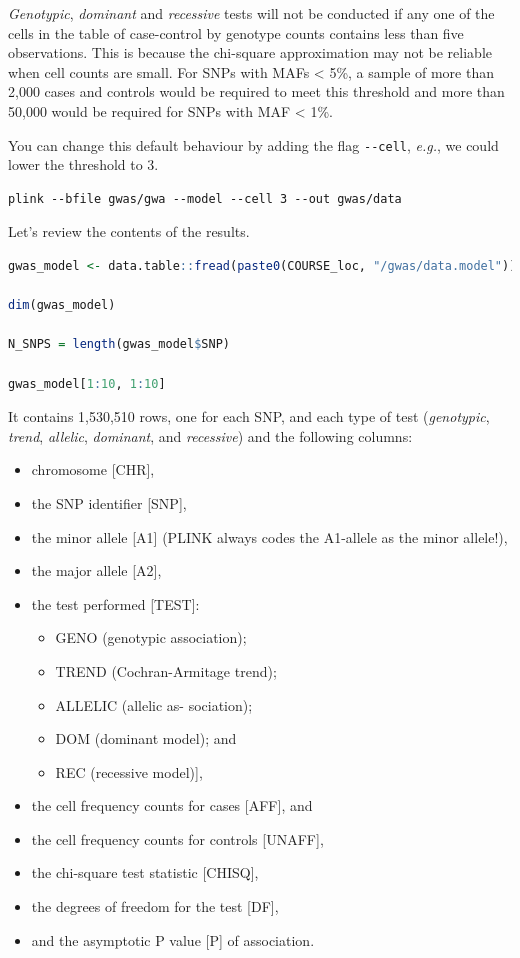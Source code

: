 \documentclass[
]{book}
\newcommand{\passthrough}[1]{#1}
\providecommand{\tightlist}{%
  \setlength{\itemsep}{0pt}\setlength{\parskip}{0pt}}
\begin{document}
\emph{Genotypic}, \emph{dominant} and \emph{recessive} tests will not be conducted if any one of the cells in the table of case-control by genotype counts contains less than five observations. This is because the chi-square approximation may not be reliable when cell counts are small. For SNPs with MAFs \textless{} 5\%, a sample of more than 2,000 cases and controls would be required to meet this threshold and more than 50,000 would be required for SNPs with MAF \textless{} 1\%.

You can change this default behaviour by adding the flag \passthrough{\lstinline!--cell!}, \emph{e.g.}, we could lower the threshold to 3.

\begin{lstlisting}
plink --bfile gwas/gwa --model --cell 3 --out gwas/data
\end{lstlisting}

Let's review the contents of the results.

\begin{lstlisting}[language=R]
gwas_model <- data.table::fread(paste0(COURSE_loc, "/gwas/data.model"))

dim(gwas_model)

N_SNPS = length(gwas_model$SNP)

gwas_model[1:10, 1:10]
\end{lstlisting}

It contains 1,530,510 rows, one for each SNP, and each type of test (\emph{genotypic}, \emph{trend}, \emph{allelic}, \emph{dominant}, and \emph{recessive}) and the following columns:

\begin{itemize}
\tightlist
\item
  chromosome {[}CHR{]},
\item
  the SNP identifier {[}SNP{]},
\item
  the minor allele {[}A1{]} (PLINK always codes the A1-allele as the minor allele!),
\item
  the major allele {[}A2{]},
\item
  the test performed {[}TEST{]}:

  \begin{itemize}
  \tightlist
  \item
    GENO (genotypic association);
  \item
    TREND (Cochran-Armitage trend);
  \item
    ALLELIC (allelic as- sociation);
  \item
    DOM (dominant model); and
  \item
    REC (recessive model){]},
  \end{itemize}
\item
  the cell frequency counts for cases {[}AFF{]}, and
\item
  the cell frequency counts for controls {[}UNAFF{]},
\item
  the chi-square test statistic {[}CHISQ{]},
\item
  the degrees of freedom for the test {[}DF{]},
\item
  and the asymptotic P value {[}P{]} of association.
\end{itemize}
\end{document}
